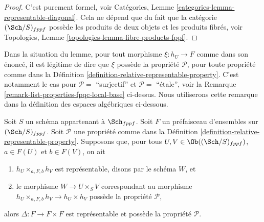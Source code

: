 \begin{proof}
C'est purement formel, voir
Catégories, Lemme \ref{categories-lemma-representable-diagonal}.
Cela ne dépend que du fait que la catégorie $(\Sch/S)_{fppf}$
possède les produits de deux objets et les produits fibrés, voir
Topologies, Lemme \ref{topologies-lemma-fibre-products-fppf}.
\end{proof}

\noindent
Dans la situation du lemme, pour tout morphisme
$\xi : h_U \to F$ comme dans son énoncé, il est légitime
de dire que $\xi$ possède la propriété $\mathcal{P}$, pour toute propriété
comme dans la Définition \ref{definition-relative-representable-property}.
C'est notamment le cas pour $\mathcal{P} = $ ``surjectif''
et $\mathcal{P} = $ ``\'etale'', voir la
Remarque \ref{remark-list-properties-fpqc-local-base}
ci-dessus. Nous utiliserons cette remarque dans la définition
des espaces algébriques ci-dessous.

\begin{lemma}
\label{lemma-transformation-diagonal-properties}
Soit $S$ un schéma appartenant à $\Sch_{fppf}$.
Soit $F$ un préfaisceau d'ensembles sur $(\Sch/S)_{fppf}$.
Soit $\mathcal{P}$ une propriété comme dans la
Définition \ref{definition-relative-representable-property}.
Supposons que, pour tous $U, V \in \Ob((\Sch/S)_{fppf})$, $a \in F(U)$ et
$b \in F(V)$, on ait
\begin{enumerate}
\item $h_U \times_{a, F, b} h_V$ est représentable, disons par le schéma $W$, et
\item le morphisme $W \to U \times_S V$ correspondant au morphisme
$h_U \times_{a, F, b} h_V \to h_U \times h_V$ possède la propriété $\mathcal{P}$,
\end{enumerate}
alors $\Delta : F \to F \times F$ est représentable et possède
la propriété $\mathcal{P}$.
\end{lemma}

